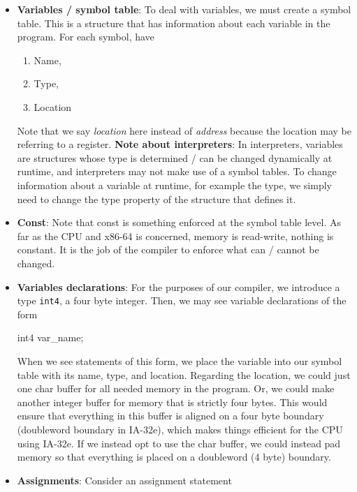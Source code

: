 \documentclass{report}
\begin{document}
\begin{itemize}
        \item \textbf{Variables / symbol table}: To deal with variables, we must create a symbol table. This is a structure that has information about each variable in the program. For each symbol, have
            \begin{enumerate}
                \item Name,
                \item Type, 
                \item Location
            \end{enumerate}
            Note that we say \textit{location} here instead of \textit{address} because the location may be referring to a register.
            \bigbreak \noindent 
            \textbf{Note about interpreters}: In interpreters, variables are structures whose type is determined / can be changed dynamically at runtime, and interpreters may not make use of a symbol tables. To change information about a variable at runtime, for example the type, we simply need to change the type property of the structure that defines it.
        \item \textbf{Const}: Note that const is something enforced at the symbol table level. As far as the CPU and x86-64 is concerned, memory is read-write, nothing is constant. It is the job of the compiler to enforce what can / cannot be changed.
        \item \textbf{Variables declarations}: For the purposes of our compiler, we introduce a type \texttt{int4}, a four byte integer. Then, we may see variable declarations of the form
            \bigbreak \noindent 
            \begin{cppcode}
            int4 var_name;
            \end{cppcode}
            \bigbreak \noindent 
            When we see statements of this form, we place the variable into our symbol table with its name, type, and location. Regarding the location, we could just one char buffer for all needed memory in the program. Or, we could make another integer buffer for memory that is strictly four bytes. This would ensure that everything in this buffer is aligned on a four byte boundary (doubleword boundary in IA-32e), which makes things efficient for the CPU using IA-32e.
            \bigbreak \noindent 
            If we instead opt to use the char buffer, we could instead pad memory so that everything is placed on a doubleword (4 byte) boundary.
        \item \textbf{Assignments}: Consider an assignment statement

\end{itemize}
\end{document}
